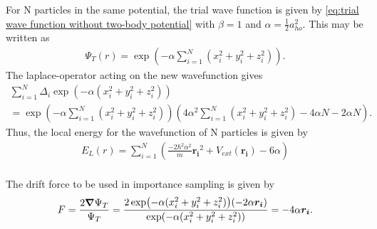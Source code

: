 For N particles in the same potential, the trial wave function is given by \autoref{eq:trial wave function without two-body potential}
with $\beta =1$ and $\alpha =\frac{1}{2}a^2 _{ho}$. This may be written as
\begin{gather*}
	\Psi_T(r) = \exp(-\alpha \sum_{i=1}^N (x_i^2 + y_i^2 + z_i^2)) .
\end{gather*}
The laplace-operator acting on the new wavefunction gives
\begin{gather*}
	\sum_{i=1}^{N} \Delta _{i} \exp(-\alpha (x_i^2+y_i^2+z_i^2)) \\
	=\exp(-\alpha \sum_{i=1}^N (x_i^2 + y_i^2 + z_i^2)) \left(4\alpha^2 \sum_{i=1}^N
	(x_i^2+y_i^2+z_i^2) - 4 \alpha N -2\alpha N \right).
\end{gather*}
Thus, the local energy for the wavefunction of N particles is given by
\begin{gather*}
E_L(r) =   \sum_{i=1}^{N}
\left(\frac{-2\hbar ^2 \alpha ^2}{m}\boldsymbol{r_i}^2+V _{ext}(\boldsymbol{r_i}) -
6 \alpha \right)\\
\end{gather*}

The drift force to be used in importance sampling is given by
\begin{gather*}
	F = \frac{2 \grad \Psi _T}{\Psi _T} = \frac{2\exp(-\alpha (x_i^2+y_i^2+z_i^2))(-2\alpha \boldsymbol{r_i})}{\exp(-\alpha (x_i^2+y_i^2+z_i^2))}
	= -4\alpha \boldsymbol{r_i}.
\end{gather*}

